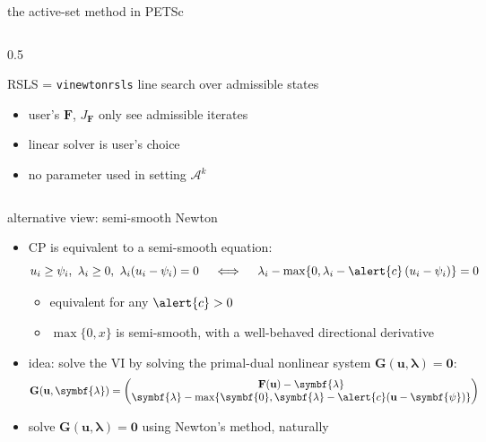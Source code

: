 \documentclass[aspectratio=169,10pt]{beamer}
\newcommand{\bu}{\mathbf{u}}
\newcommand{\bF}{\mathbf{F}}
\newcommand{\bG}{\mathbf{G}}
\newcommand{\blambda}{\symbf{\lambda}}
\newcommand{\bpsi}{\symbf{\psi}}
\newcommand{\bzero}{\symbf{0}}
\newcommand{\cA}{{\mathcal{A}}}
\newcommand{\lc}{{\text{\large $\circ$}}}
\newcommand{\pfcomm}[1]{\grey{\footnotesize (#1)}}
\begin{document}
\begin{frame}{the active-set method in PETSc}
\begin{columns}
\begin{column}{0.5\textwidth}
{\begin{block}{RSLS = \texttt{vinewtonrsls}}
line search over admissible states
\end{block}

\begin{itemize}
\item \alert{user's $\bF$, $J_{\bF}$ only see admissible iterates}
\item linear solver is user's choice \pfcomm{CG, multigrid, \dots}
\item no parameter used in setting $\cA^k$
\end{itemize}
}
\end{column}
\end{columns}
\end{frame}


\begin{frame}{alternative view: semi-smooth Newton}

\begin{itemize}
\item CP is equivalent to a \alert{semi-smooth equation}:
    $$u_i\ge \psi_i, \,\, \lambda_i \ge 0, \,\, \lambda_i(u_i-\psi_i)=0 \quad \iff \quad \lambda_i - \max\{0,\lambda_i - \alert{c}\,(u_i-\psi_i)\} = 0$$

    \begin{itemize}
    \item[$\lc$] equivalent for any $\alert{c}>0$
    \item[$\lc$] $\max\{0,x\}$ is semi-smooth, with a well-behaved directional derivative
    \end{itemize}

\smallskip
\item idea: solve the VI by solving the \alert{primal-dual} nonlinear system $\bG(\bu,\blambda)=\bzero$:
    $$\bG(\bu,\blambda) = \begin{pmatrix} \bF(\bu) - \blambda \\ \blambda - \max\{\bzero,\blambda - \alert{c}(\bu-\bpsi)\} \end{pmatrix}$$
\item solve $\bG(\bu,\blambda)=\bzero$ using Newton's method, naturally
\end{itemize}
\end{frame}
\end{document}
